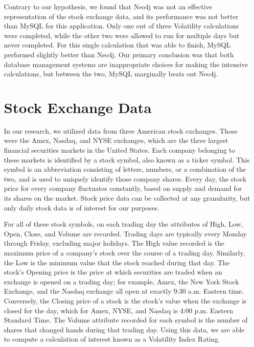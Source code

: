 \documentclass{IEEEtran}
\begin{document}
Contrary to our hypothesis, we found that Neo4j was not an effective representation of the stock exchange data, and its performance was not better than MySQL for this application. Only one out of three Volatility calculations were completed, while the other two were allowed to run for multiple days but never completed. For this single calculation that was able to finish, MySQL performed slightly better than Neo4j. Our primary conclusion was that both database management systems are inappropriate choices for making the intensive calculations, but between the two, MySQL marginally beats out Neo4j.  

\section{Stock Exchange Data}

In our research, we utilized data from three American stock exchanges. Those were the Amex, Nasdaq, and NYSE exchanges, which are the three largest financial securities markets in the United States. Each company belonging to these markets is identified by a stock symbol, also known as a ticker symbol. This symbol is an abbreviation consisting of letters, numbers, or a combination of the two, and is used to uniquely identify those company shares. Every day, the stock price for every company fluctuates constantly, based on supply and demand for its shares on the market. Stock price data can be collected at any granularity, but only daily stock data is of interest for our purposes. 

For all of these stock symbols, on each trading day the attributes of High, Low, Open, Close, and Volume are recorded. Trading days are typically every Monday through Friday, excluding major holidays. The High value recorded is the maximum price of a company’s stock over the course of a trading day. Similarly, the Low is the minimum value that the stock reached during that day. The stock’s Opening price is the price at which securities are traded when an exchange is opened on a trading day; for example, Amex, the New York Stock Exchange, and the Nasdaq exchange all open at exactly 9:30 a.m. Eastern time. Conversely, the Closing price of a stock is the stock’s value when the exchange is closed for the day, which for Amex, NYSE, and Nasdaq is 4:00 p.m. Eastern Standard Time. The Volume attribute recorded for each symbol is the number of shares that changed hands during that trading day. Using this data, we are able to compute a calculation of interest known as a Volatility Index Rating. 
\end{document}
